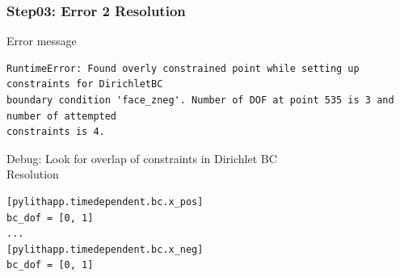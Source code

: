 \documentclass{beamer}
\newcommand{\errlabel}[1]{{\small \color{blue}#1}}
\newcommand{\debuginfo}[1]{{\small \color{green}#1}}
\begin{document}
\begin{frame}[fragile]
  \frametitle{Step03: Error 2 Resolution}

\errlabel{Error message}
\begin{lstlisting}
RuntimeError: Found overly constrained point while setting up constraints for DirichletBC
boundary condition 'face_zneg'. Number of DOF at point 535 is 3 and number of attempted
constraints is 4.
\end{lstlisting}\pause
\errlabel{Debug:} \debuginfo{Look for overlap of constraints in Dirichlet BC}\pause\\
\errlabel{Resolution}
\begin{lstlisting}
[pylithapp.timedependent.bc.x_pos]
bc_dof = [0, 1]
...
[pylithapp.timedependent.bc.x_neg]
bc_dof = [0, 1]
\end{lstlisting}

\end{frame}
\end{document}
